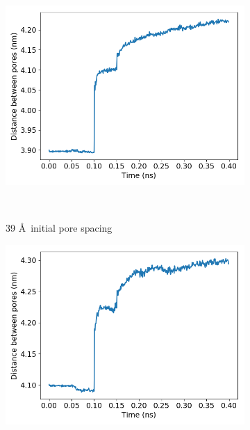 \documentclass{article}
\begin{document}
\begin{enumerate}
\begin{enumerate}
	  \end{enumerate} 

  	  \begin{figure}[htp]
		\centering
		\begin{subfigure}{0.3\textwidth}
			\includegraphics[width=\textwidth]{p2p_39.png}\quad
			\vspace{-1.25em}
			\caption{39 \AA~initial pore spacing}~\label{fig:p2p_39}
		\end{subfigure}
		\begin{subfigure}{0.3\textwidth}
			\includegraphics[width=\textwidth]{p2p_41.png}\quad
			\vspace{-1.25em}

\end{subfigure}
\end{figure}
\end{enumerate}
\end{document}
